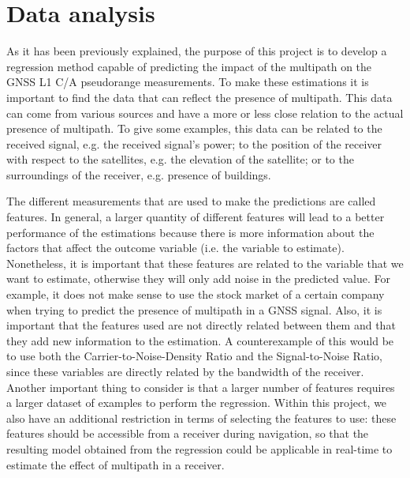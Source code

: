 \documentclass[a4paper, report, oneside, UKenglish]{memoir}
\begin{document}
        


\chapter{Data analysis}\label{ch:data_analysis}

As it has been previously explained, the purpose of this project is to develop a regression method capable of predicting the impact of the multipath on the GNSS L1 C/A pseudorange measurements. To make these estimations it is important to find the data that can reflect the presence of multipath. This data can come from various sources and have a more or less close relation to the actual presence of multipath. To give some examples, this data can be related to the received signal, e.g. the received signal's power; to the position of the receiver with respect to the satellites, e.g. the elevation of the satellite; or to the surroundings of the receiver, e.g. presence of buildings. 

The different measurements that are used to make the predictions are called features. In general, a larger quantity of different features will lead to a better performance of the estimations because there is more information about the factors that affect the outcome variable (i.e. the variable to estimate). Nonetheless, it is important that these features are related to the variable that we want to estimate, otherwise they will only add noise in the predicted value. For example, it does not make sense to use the stock market of a certain company when trying to predict the presence of multipath in a GNSS signal. Also, it is important that the features used are not directly related between them and that they add new information to the estimation. A counterexample of this would be to use both the Carrier-to-Noise-Density Ratio and the Signal-to-Noise Ratio, since these variables are directly related by the bandwidth of the receiver. Another important thing to consider is that a larger number of features requires a larger dataset of examples to perform the regression. Within this project, we also have an additional restriction in terms of selecting the features to use: these features should be accessible from a receiver during navigation, so that the resulting model obtained from the regression could be applicable in real-time to estimate the effect of multipath in a receiver.
\end{document}
